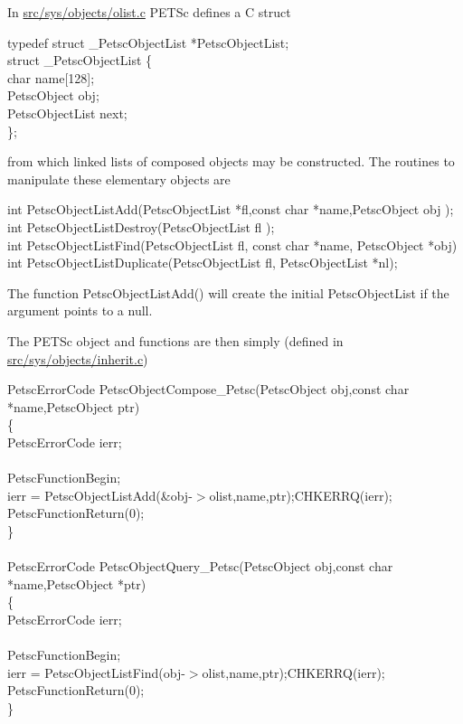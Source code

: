\documentclass[twoside,12pt]{../sty/report_petsc}
\begin{document}
In \href{http://www.mcs.anl.gov/petsc/petsc-master/src/objects/olist.c.html}{src/sys/objects/olist.c} PETSc defines a C struct
\begin{tabbing}
typedef struct \_PetscObjectList *PetscObjectList;\\
struct \_PetscObjectList \{\\
    char             name[128];\\
    PetscObject      obj;\\
    PetscObjectList  next;\\
\};
\end{tabbing}
from which linked lists of composed objects may be constructed. The routines
to manipulate these elementary objects are
\begin{tabbing}
  int PetscObjectListAdd(PetscObjectList *fl,const char *name,PetscObject obj );\\
  int PetscObjectListDestroy(PetscObjectList fl );\\
  int PetscObjectListFind(PetscObjectList fl, const char *name, PetscObject *obj)\\
  int PetscObjectListDuplicate(PetscObjectList fl, PetscObjectList *nl);
\end{tabbing}
The function PetscObjectListAdd() will create the initial PetscObjectList if the argument
 points to a null.

The PETSc object  and  functions are then simply
(defined in \href{http://www.mcs.anl.gov/petsc/petsc-master/src/objects/inherit.c.html}{src/sys/objects/inherit.c})
\begin{tabbing}
  PetscErrorCode PetscObjectCompose\_Petsc(PetscObject obj,const char *name,PetscObject ptr)\\
  \{\\
    PetscErrorCode ierr;\\
\\
    PetscFunctionBegin;\\
    ierr = PetscObjectListAdd(\&obj-$>$olist,name,ptr);CHKERRQ(ierr);\\
    PetscFunctionReturn(0);\\
  \}\\
\\
  PetscErrorCode PetscObjectQuery\_Petsc(PetscObject obj,const char *name,PetscObject *ptr)\\
  \{\\
    PetscErrorCode ierr;\\
\\
    PetscFunctionBegin;\\
    ierr = PetscObjectListFind(obj-$>$olist,name,ptr);CHKERRQ(ierr);\\
    PetscFunctionReturn(0); \\
  \}
\end{tabbing}
\end{document}
